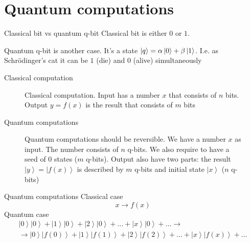 \documentclass[10pt,pdf,hyperref={unicode}]{beamer}
\begin{document}
\section{Quantum computations}
\begin{frame}{Classical bit vs quantum q-bit}
  Classical bit is either $0$ or $1$.

  Quantum q-bit is another case. It's a state
  $\ket{q} = \alpha \ket{0} + \beta \ket{1}$. I.e. as Schrödinger's
  cat it can be $1$ (die) and $0$ (alive) simultaneously
\end{frame}

\begin{frame}{Classical computation}
\begin{figure}
\centering



\caption{Classical computation. Input has a number $x$ that consists
  of  $n$ bits. Output $y = f\left(x\right)$ is the result that
  consists of $m$ bits}
\label{figQuantCompClassComp}
\end{figure}
\end{frame}

\begin{frame}{Quantum computations}
\begin{figure}
\centering

\scalebox{.8}{}

\caption{Quantum computations should be reversible. We have a number
  $x$ as input. The number consists of $n$ q-bits. We also require to
  have a seed of $0$ states ($m$ q-bits). Output also have two parts: the result $\left|y\right> =
  \left|f\left(x\right)\right>$ is described by $m$ q-bits and initial
  state $\left|x\right>$ ($n$ q-bits)} 
\label{figQuantCompQuantComp}
\end{figure}
\end{frame}


\begin{frame}{Quantum computations}
Classical case
\[
x \to f(x)
\]
Quantum case
\begin{eqnarray}
\left|0\right>\left|0\right> + \left|1\right>\left|0\right> + \left|2\right>\left|0\right> +
\dots + \left|x\right>\left|0\right> + \dots \to
\nonumber \\
\to 
\left|0\right>\left|f(0)\right> + \left|1\right>\left|f(1)\right> + \left|2\right>\left|f(2)\right> +
\dots + \left|x\right>\left|f(x)\right> + \dots
\nonumber
\end{eqnarray}
\end{frame}
\end{document}
